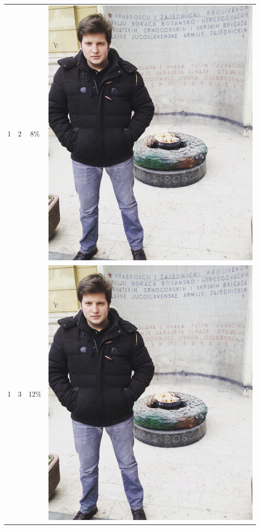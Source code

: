 \documentclass[times, utf8, seminar]{fer}
\begin{document}
\begin{center}
\begin{longtable}{|c|c|c|c|}
1 & 2 &8\% & \includegraphics[scale=0.3]{../benchmark_results/pattern/1_components-2_bits.png} \\
1 & 3 &12\% & \includegraphics[scale=0.3]{../benchmark_results/pattern/1_components-3_bits.png} \\

\end{longtable}
\end{center}
\end{document}
